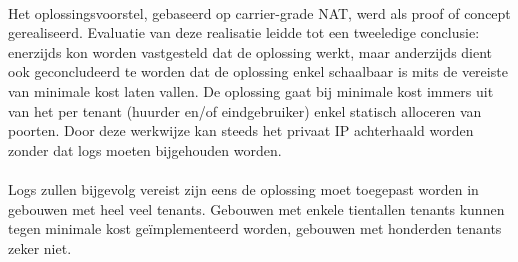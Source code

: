 \paragraph{}
Het oplossingsvoorstel, gebaseerd op carrier-grade NAT, werd als proof of concept gerealiseerd. Evaluatie van deze realisatie leidde tot een tweeledige conclusie: enerzijds kon worden vastgesteld dat de oplossing werkt, maar anderzijds dient ook geconcludeerd te worden dat de oplossing enkel schaalbaar is mits de vereiste van minimale kost laten vallen.
De oplossing gaat bij minimale kost immers uit van het per tenant (huurder en/of eindgebruiker) enkel statisch alloceren van poorten. Door deze werkwijze kan steeds het privaat IP achterhaald worden zonder dat logs moeten bijgehouden worden.
\paragraph{}
Logs zullen bijgevolg vereist zijn eens de oplossing moet toegepast worden in gebouwen met heel veel tenants. Gebouwen met enkele tientallen tenants kunnen tegen minimale kost geïmplementeerd worden, gebouwen met honderden tenants zeker niet.
